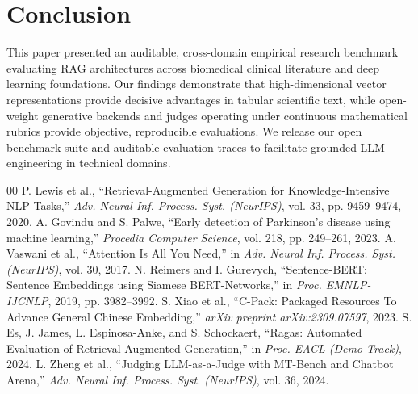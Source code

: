 \documentclass[conference]{IEEEtran}
\begin{document}
\section{Conclusion}
This paper presented an auditable, cross-domain empirical research benchmark evaluating RAG architectures across biomedical clinical literature and deep learning foundations. Our findings demonstrate that high-dimensional vector representations provide decisive advantages in tabular scientific text, while open-weight generative backends and judges operating under continuous mathematical rubrics provide objective, reproducible evaluations. We release our open benchmark suite and auditable evaluation traces to facilitate grounded LLM engineering in technical domains.

\begin{thebibliography}{00}
 P. Lewis et al., ``Retrieval-Augmented Generation for Knowledge-Intensive NLP Tasks,'' \textit{Adv. Neural Inf. Process. Syst. (NeurIPS)}, vol. 33, pp. 9459--9474, 2020.
 A. Govindu and S. Palwe, ``Early detection of Parkinson's disease using machine learning,'' \textit{Procedia Computer Science}, vol. 218, pp. 249--261, 2023.
 A. Vaswani et al., ``Attention Is All You Need,'' in \textit{Adv. Neural Inf. Process. Syst. (NeurIPS)}, vol. 30, 2017.
 N. Reimers and I. Gurevych, ``Sentence-BERT: Sentence Embeddings using Siamese BERT-Networks,'' in \textit{Proc. EMNLP-IJCNLP}, 2019, pp. 3982--3992.
 S. Xiao et al., ``C-Pack: Packaged Resources To Advance General Chinese Embedding,'' \textit{arXiv preprint arXiv:2309.07597}, 2023.
 S. Es, J. James, L. Espinosa-Anke, and S. Schockaert, ``Ragas: Automated Evaluation of Retrieval Augmented Generation,'' in \textit{Proc. EACL (Demo Track)}, 2024.
 L. Zheng et al., ``Judging LLM-as-a-Judge with MT-Bench and Chatbot Arena,'' \textit{Adv. Neural Inf. Process. Syst. (NeurIPS)}, vol. 36, 2024.
\end{thebibliography}
\end{document}
